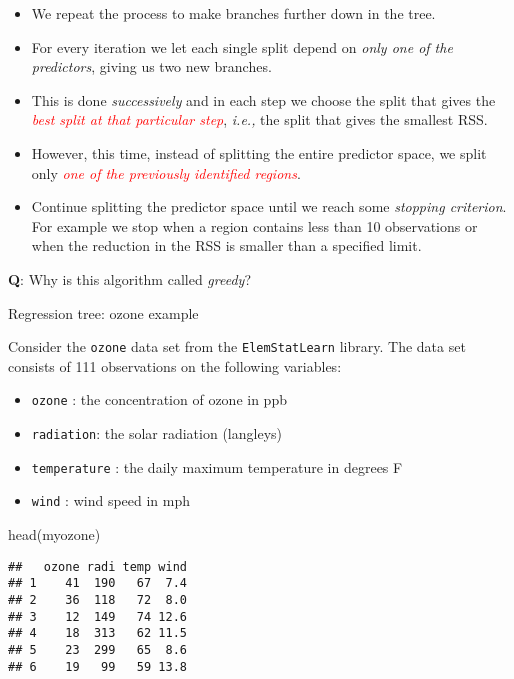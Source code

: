 \documentclass[
  10pt,
  ignorenonframetext,
]{beamer}
\newenvironment{Shaded}{\begin{snugshade}}{\end{snugshade}}
\newcommand{\FunctionTok}[1]{\textcolor[rgb]{0.00,0.00,0.00}{#1}}
\newcommand{\NormalTok}[1]{#1}
\providecommand{\tightlist}{%
  \setlength{\itemsep}{0pt}\setlength{\parskip}{0pt}}
\begin{document}
\begin{frame}
\begin{itemize}
\item
  We repeat the process to make branches further down in the tree.
\item
  For every iteration we let each single split depend on \emph{only one
  of the predictors}, giving us two new branches.
\item
  This is done \emph{successively} and in each step we choose the split
  that gives the
  \emph{\textcolor{red}{best split at that particular step}},
  \emph{i.e.,} the split that gives the smallest RSS.
\item
  However, this time, instead of splitting the entire predictor space,
  we split only
  \emph{\textcolor{red}{one of the previously identified regions}}.
\item
  Continue splitting the predictor space until we reach some
  \emph{stopping criterion}. For example we stop when a region contains
  less than 10 observations or when the reduction in the RSS is smaller
  than a specified limit.
\end{itemize}

\vspace{1mm}

\textbf{Q}: Why is this algorithm called \emph{greedy}?
\end{frame}

\begin{frame}[fragile]
\begin{block}{Regression tree: ozone example}
\protect\hypertarget{regression-tree-ozone-example}{}
\vspace{2mm}

Consider the \texttt{ozone} data set from the \texttt{ElemStatLearn}
library. The data set consists of 111 observations on the following
variables:

\begin{itemize}
\tightlist
\item
  \texttt{ozone} : the concentration of ozone in ppb
\item
  \texttt{radiation}: the solar radiation (langleys)
\item
  \texttt{temperature} : the daily maximum temperature in degrees F
\item
  \texttt{wind} : wind speed in mph
\end{itemize}

\vspace{2mm}

\scriptsize

\begin{Shaded}
\begin{Highlighting}[]
\FunctionTok{head}\NormalTok{(myozone)}
\end{Highlighting}
\end{Shaded}

\begin{verbatim}
##   ozone radi temp wind
## 1    41  190   67  7.4
## 2    36  118   72  8.0
## 3    12  149   74 12.6
## 4    18  313   62 11.5
## 5    23  299   65  8.6
## 6    19   99   59 13.8
\end{verbatim}
\end{block}
\end{frame}
\end{document}
